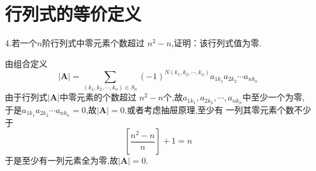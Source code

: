 \section{行列式的等价定义}
4.若一个$n$阶行列式中零元素个数超过
$n^2-n$,证明：该行列式值为零.
\begin{Proof}
	由组合定义
	\[
	\left|\bm{A}\right|=
	\sum_{\left(k_1,k_2,\cdots,k_n\right)\in S_n}
	\left(-1\right)^{N\left(k_1,k_2,\cdots,k_n\right)}a_{1k_1}a_{2k_2}\cdots
	a_{nk_n}
	\]
	由于行列式$\left|\bm{A}\right|$中零元素的个数超过
$n^2-n$个,故$a_{1k_1},a_{2k_2},\cdots,
	a_{nk_n}$中至少一个为零,于是$a_{1k_1}a_{2k_2}\cdots
	a_{nk_n}=0$,故$\left|\bm{A}\right|=0.$或者考虑抽屉原理,至少有
	一列其零元素个数不少于
	\[
	\left[\frac{n^2-n}{n}\right]+1=n
	\]
	于是至少有一列元素全为零,故$\left|\bm{A}\right|=0.$
\end{Proof}

